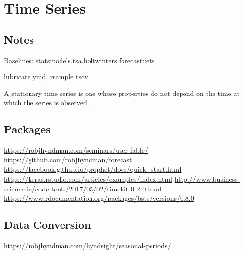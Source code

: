 \documentclass[]{book}
\newenvironment{Shaded}{\begin{snugshade}}{\end{snugshade}}
\newcommand{\KeywordTok}[1]{\textcolor[rgb]{0.13,0.29,0.53}{\textbf{#1}}}
\newcommand{\DataTypeTok}[1]{\textcolor[rgb]{0.13,0.29,0.53}{#1}}
\newcommand{\DecValTok}[1]{\textcolor[rgb]{0.00,0.00,0.81}{#1}}
\newcommand{\FloatTok}[1]{\textcolor[rgb]{0.00,0.00,0.81}{#1}}
\newcommand{\StringTok}[1]{\textcolor[rgb]{0.31,0.60,0.02}{#1}}
\newcommand{\OperatorTok}[1]{\textcolor[rgb]{0.81,0.36,0.00}{\textbf{#1}}}
\newcommand{\NormalTok}[1]{#1}
\begin{document}
\chapter{Time Series}\label{time-series}

\section{Notes}\label{notes}

Baselines: statsmodels.tsa.holtwinters \textbar{} forecast::ets

lubricate ymd, rsample tscv

A stationary time series is one whose properties do not depend on the
time at which the series is observed.

\section{Packages}\label{packages}

\url{https://robjhyndman.com/seminars/user-fable/}
\url{https://github.com/robjhyndman/forecast}
\url{https://facebook.github.io/prophet/docs/quick_start.html}
\url{https://keras.rstudio.com/articles/examples/index.html}
\url{http://www.business-science.io/code-tools/2017/05/02/timekit-0-2-0.html}
\url{https://www.rdocumentation.org/packages/bsts/versions/0.8.0}

\section{Data Conversion}\label{data-conversion}

\url{https://robjhyndman.com/hyndsight/seasonal-periods/}

\begin{Shaded}
\end{Shaded}
\end{document}
